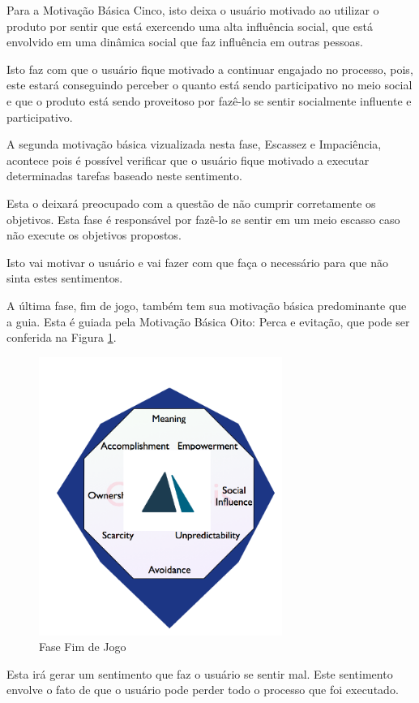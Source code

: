 Para a Motivação Básica Cinco, isto deixa o usuário motivado ao utilizar o produto
por sentir que está exercendo uma alta influência social, que está envolvido em
uma dinâmica social que faz influência em outras pessoas.

Isto faz com que o usuário fique motivado a continuar engajado no processo, pois,
este estará conseguindo perceber o quanto está sendo participativo no meio social
e que o produto está sendo proveitoso por fazê-lo se sentir socialmente influente
e participativo.


A segunda motivação básica vizualizada nesta fase, Escassez e Impaciência, acontece
pois é possível verificar que o usuário fique motivado a executar determinadas
tarefas baseado neste sentimento.

Esta o deixará preocupado com a questão de não cumprir corretamente os objetivos.
Esta fase é responsável por fazê-lo se sentir em um meio escasso caso não execute
os objetivos propostos.

Isto vai motivar o usuário e vai fazer com que faça o necessário para que não
sinta estes sentimentos.

A última fase, fim de jogo, também tem sua motivação básica predominante que
a guia. Esta é guiada pela Motivação Básica Oito: Perca e evitação, que pode
ser conferida na Figura \ref{fig:fasefimdejogo}.

\begin{figure}[h]
    \centering
    \includegraphics[width=300px, scale=1]{figuras/fasefimdejogo}
    \caption{Fase Fim de Jogo}
    \label{fig:fasefimdejogo}
\end{figure}

Esta irá gerar um sentimento que faz o usuário se sentir mal. Este sentimento
envolve o fato de que o usuário pode perder todo o processo que foi executado.


